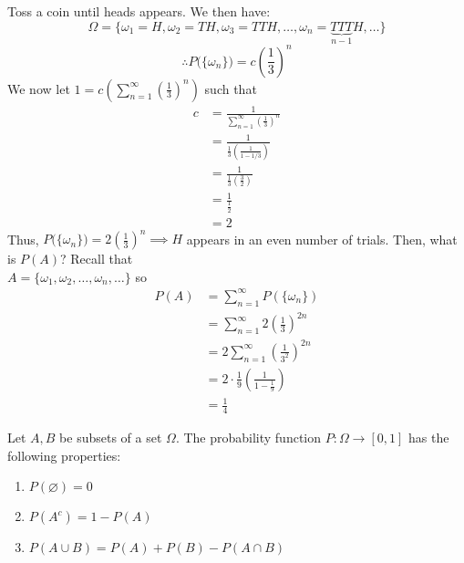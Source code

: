 \documentclass{article}
\begin{document}
	\begin{exmp}
		Toss a coin until heads appears. We then have:
		$$ \Omega = \{ \omega_1 = H, \omega_2 = TH, \omega_3 = TTH, \dots, \omega_n = \underbrace{TTT}_{n-1}H, \dots \}$$
		$$ \therefore P \big( \{ \omega_n \} \big) = c \left( \frac{1}{3}\right)^n$$
		We now let $1 = c \left( \sum_{n=1}^\infty \left( \frac13\right)^n \right)$ such that
		\begin{align*}
			c &= \frac{1}{\sum_{n=1}^\infty \left( \frac13 \right)^n} \\
			&= \frac{1}{\frac{1}{3} \left( \frac{1}{1-1/3} \right)} \\
			&= \frac{1}{\frac{1}{3} \left( \frac{3}{2} \right)} \\
			&= \frac{1}{\frac12}\\
			&= 2
		\end{align*}
		Thus, $P \big( \{ \omega_n \} \big) = 2 \left(\frac{1}{3}\right)^n \implies H$ appears in an even number of trials. Then, what is $P(A)$? Recall that \\ $A = \{ \omega_1, \omega_2, \dots, \omega_n, \dots\} $ so \\
		\vspace{-1cm}
		\begin{align*}
			P(A) &= \sum_{n=1}^\infty P \left( \{ \omega_n \} \right) \\
			&= \sum_{n=1}^\infty 2 \left( \frac13 \right)^{2n} \\
			&= 2 \sum_{n=1}^\infty \left( \frac{1}{3^2} \right)^{2n} \\
			&= 2 \cdot \frac19 \left( \frac{1}{1-\frac{1}{9}}\right) \\
			&= \frac14
		\end{align*}
	\end{exmp}
	\begin{thm}
		Let $A, B$ be subsets of a set $\Omega$. The probability function $P: \Omega \to [0,1]$ has the following properties:
		\begin{enumerate}
			\item $P(\varnothing) = 0$ 
			\item $P(A^c) = 1 - P(A)$
			\item $P(A \cup B) =  P(A) + P(B) - P(A \cap B)$
		\end{enumerate}
	\end{thm}
	\pagebreak
\end{document}

